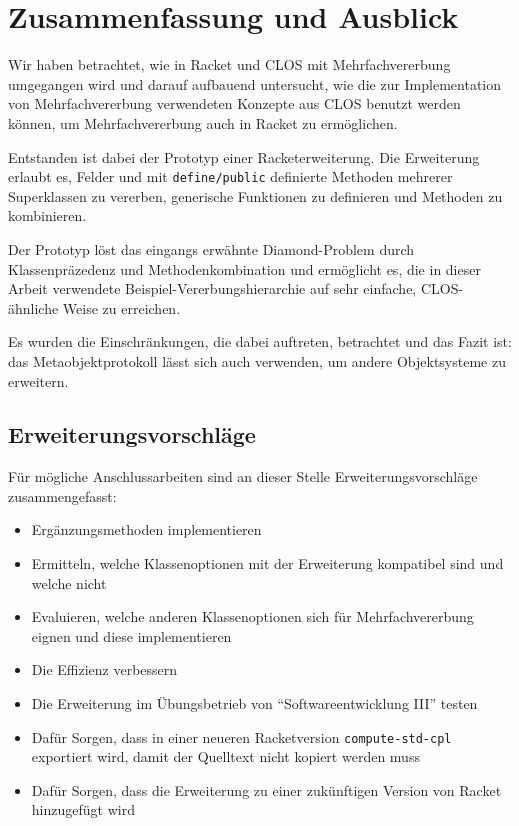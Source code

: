 \chapter{Zusammenfassung und Ausblick}
Wir haben betrachtet, wie in Racket und CLOS mit Mehrfachvererbung umgegangen wird und darauf aufbauend untersucht, wie die zur Implementation von Mehrfachvererbung verwendeten Konzepte aus CLOS benutzt werden können, um Mehrfachvererbung auch in Racket zu ermöglichen.

Entstanden ist dabei der Prototyp einer Racketerweiterung. Die Erweiterung erlaubt es, Felder und mit \texttt{define/public} definierte Methoden mehrerer Superklassen zu vererben, generische Funktionen zu definieren und Methoden zu kombinieren.

Der Prototyp löst das eingangs erwähnte Diamond-Problem durch Klassenpräzedenz und Methodenkombination und ermöglicht es, die in dieser Arbeit verwendete Beispiel-Vererbungshierarchie auf sehr einfache, CLOS-ähnliche Weise zu erreichen.

Es wurden die Einschränkungen, die dabei auftreten, betrachtet und das Fazit ist: das Metaobjektprotokoll lässt sich auch verwenden, um andere Objektsysteme zu erweitern.

\section{Erweiterungsvorschläge}

Für mögliche Anschlussarbeiten sind an dieser Stelle Erweiterungsvorschläge zusammengefasst:
\begin{itemize}
 \item Ergänzungsmethoden implementieren
 \item Ermitteln, welche Klassenoptionen mit der Erweiterung kompatibel sind und welche nicht
 \item Evaluieren, welche anderen Klassenoptionen sich für Mehrfachvererbung eignen und diese implementieren
 \item Die Effizienz verbessern
 \item Die Erweiterung im Übungsbetrieb von ``Softwareentwicklung III'' testen
 \item Dafür Sorgen, dass in einer neueren Racketversion \texttt{compute-std-cpl} exportiert wird, damit der Quelltext nicht kopiert werden muss
 \item Dafür Sorgen, dass die Erweiterung zu einer zukünftigen Version von Racket hinzugefügt wird 
\end{itemize}